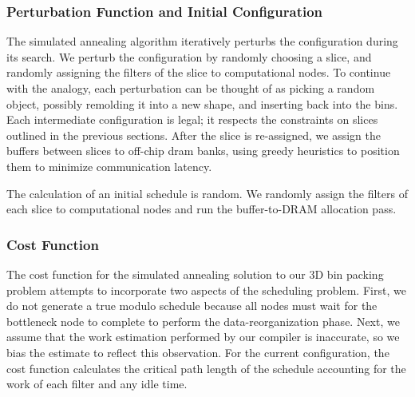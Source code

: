 \subsubsection{Perturbation Function and Initial Configuration}
The simulated annealing algorithm iteratively perturbs the
configuration during its search.  We perturb the configuration by
randomly choosing a slice, and randomly assigning the filters of the
slice to computational nodes.  To continue with the analogy, each
perturbation can be thought of as picking a random object, possibly
remolding it into a new shape, and inserting back into the bins. Each
intermediate configuration is legal; it respects the constraints on
slices outlined in the previous sections.  After the slice is
re-assigned, we assign the buffers between slices to off-chip dram
banks, using greedy heuristics to position them to minimize
communication latency.

The calculation of an initial schedule is random.  We randomly assign
the filters of each slice to computational nodes and run the
buffer-to-DRAM allocation pass.  

\subsubsection{Cost Function}
The cost function for the simulated annealing solution to our 3D bin
packing problem attempts to incorporate two aspects of the scheduling
problem.  First, we do not generate a true modulo schedule because all
nodes must wait for the bottleneck node to complete to perform the
data-reorganization phase. Next, we assume that the work estimation
performed by our compiler is inaccurate, so we bias the estimate to
reflect this observation.  For the current configuration, the cost
function calculates the critical path length of the schedule
accounting for the work of each filter and any idle time.



